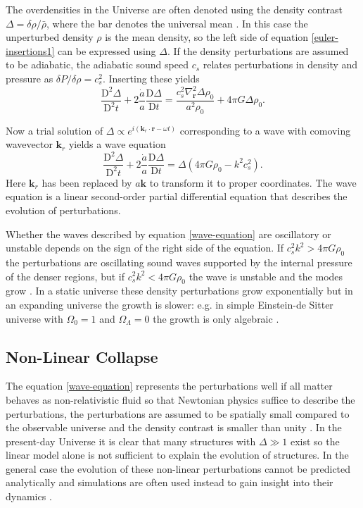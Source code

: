\documentclass[english, twoside]{HYgradu}
\begin{document}
The overdensities in the Universe are often denoted using the density contrast $\Delta = \delta\rho/\bar{\rho}$, where the bar denotes the universal mean \citep{mo2010galaxy}. In this case the unperturbed density $\rho$ is the mean density, so the left side of equation \ref{euler-insertions1} can be expressed using $\Delta$. If the density perturbations are assumed to be adiabatic, the adiabatic sound speed $c_s$ relates perturbations in density and pressure as $\delta P / \delta \rho = c_s^2$. Inserting these yields
\begin{equation}\label{euler-insertions1}
\frac{\textrm{D}^2\Delta}{\textrm{D}^2 t} + 2 \frac{\dot a}{a} \frac{\textrm{D}\Delta}{\textrm{D} t} = \frac{c_s^2 \nabla_\mathbf{r}^2 \Delta \rho_0}{a^2 \rho_0} + 4 \pi G \Delta \rho_0.
\end{equation}

Now a trial solution of $\Delta \propto e^{i(\mathbf{k}_r\cdot\mathbf{r}-\omega t)}$ corresponding to a wave with comoving wavevector $\mathbf{k}_r$ yields a wave equation
\begin{equation}\label{wave-equation}
\frac{\textrm{D}^2\Delta}{\textrm{D}^2 t} + 2 \frac{\dot a}{a} \frac{\textrm{D}\Delta}{\textrm{D} t} = \Delta(4\pi G \rho_0 - k^2c_s^2).
\end{equation}
Here $\mathbf{k}_r$ has been replaced by $a\mathbf{k}$ to transform it to proper coordinates. The wave equation is a linear second-order partial differential equation that describes the evolution of perturbations.

Whether the waves described by equation \ref{wave-equation} are oscillatory or unstable depends on the sign of the right side of the equation. If $c_s^2k^2 > 4\pi G\rho_0$ the perturbations are oscillating sound waves  supported by the internal pressure of the denser regions, but if $c_s^2k^2 < 4\pi G\rho_0$ the wave is unstable and the modes grow \citep{longair2008galaxy}. In a static universe these density perturbations grow exponentially but in an expanding universe the growth is slower: e.g. in simple Einstein-de Sitter universe with $\Omega_0 = 1$ and $\Omega_\Lambda = 0$ the growth is only algebraic \citep{longair2008galaxy}.

\subsection{Non-Linear Collapse} \label{universe-collapse}

The equation \ref{wave-equation} represents the perturbations well if all matter behaves as non-relativistic fluid so that Newtonian physics suffice to describe the perturbations, the perturbations are assumed to be spatially small compared to the observable universe and the density contrast is smaller than unity \citep{mo2010galaxy}. In the present-day Universe it is clear that many structures with $\Delta \gg 1$ exist so the linear model alone is not sufficient to explain the evolution of structures. In the general case the evolution of these non-linear perturbations cannot be predicted analytically and simulations are often used instead to gain insight into their dynamics \citep{mo2010galaxy}.
\end{document}
